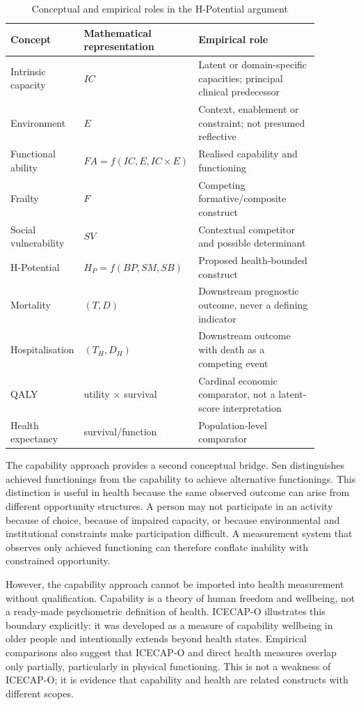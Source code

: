 \begin{table}[htbp]
\centering
\caption{Conceptual and empirical roles in the H-Potential argument}
\label{tab:concept_roles}
\small
\begin{tabular}{p{0.22\linewidth}p{0.22\linewidth}p{0.44\linewidth}}
\hline
Concept & Mathematical representation & Empirical role \\
\hline
Intrinsic capacity & $IC$ & Latent or domain-specific capacities; principal clinical predecessor \\
Environment & $E$ & Context, enablement or constraint; not presumed reflective \\
Functional ability & $FA=f(IC,E,IC\times E)$ & Realised capability and functioning \\
Frailty & $F$ & Competing formative/composite construct \\
Social vulnerability & $SV$ & Contextual competitor and possible determinant \\
H-Potential & $H_P=f(BP,SM,SB)$ & Proposed health-bounded construct \\
Mortality & $(T,D)$ & Downstream prognostic outcome, never a defining indicator \\
Hospitalisation & $(T_H,D_H)$ & Downstream outcome with death as a competing event \\
QALY & utility $\times$ survival & Cardinal economic comparator, not a latent-score interpretation \citep{whitehead_2010,drummond2015} \\
Health expectancy & survival/function & Population-level comparator \\
\hline
\end{tabular}
\end{table}

The capability approach provides a second conceptual bridge. Sen distinguishes achieved functionings from the capability to achieve alternative functionings. \citep{sen_1993} This distinction is useful in health because the same observed outcome can arise from different opportunity structures. A person may not participate in an activity because of choice, because of impaired capacity, or because environmental and institutional constraints make participation difficult. A measurement system that observes only achieved functioning can therefore conflate inability with constrained opportunity.

However, the capability approach cannot be imported into health measurement without qualification. Capability is a theory of human freedom and wellbeing, not a ready-made psychometric definition of health. ICECAP-O illustrates this boundary explicitly: it was developed as a measure of capability wellbeing in older people and intentionally extends beyond health states. \citep{icecap_o,icecap_o_validation} Empirical comparisons also suggest that ICECAP-O and direct health measures overlap only partially, particularly in physical functioning. \citep{icecap_o_validation} This is not a weakness of ICECAP-O; it is evidence that capability and health are related constructs with different scopes.

